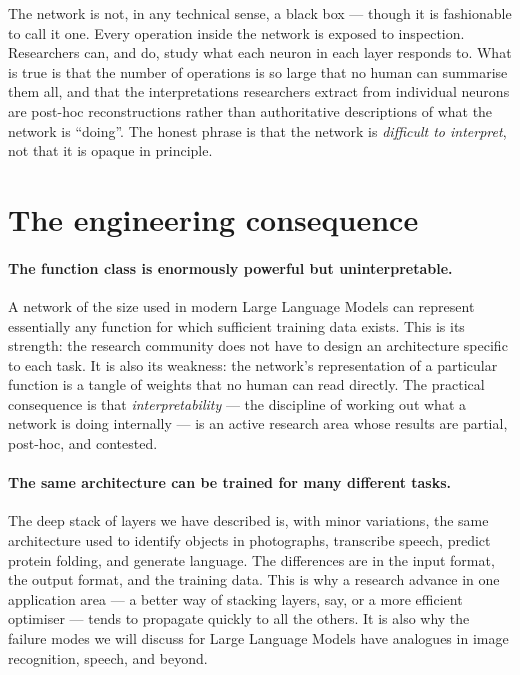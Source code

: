 The network is not, in any technical sense, a black box ---
though it is fashionable to call it one. Every operation
inside the network is exposed to inspection. Researchers can,
and do, study what each neuron in each layer responds to.
What is true is that the number of operations is so large
that no human can summarise them all, and that the
interpretations researchers extract from individual neurons
are post-hoc reconstructions rather than authoritative
descriptions of what the network is ``doing''. The honest
phrase is that the network is \emph{difficult to interpret},
not that it is opaque in principle.

\section{The engineering consequence}

\paragraph{The function class is enormously powerful but
uninterpretable.} A network of the size used in modern Large
Language Models can represent essentially any function for which
sufficient training data exists. This is its strength: the
research community does not have to design an architecture
specific to each task. It is also its weakness: the network's
representation of a particular function is a tangle of weights
that no human can read directly. The practical consequence is
that \emph{interpretability} --- the discipline of working out
what a network is doing internally --- is an active research
area whose results are partial, post-hoc, and contested.

\paragraph{The same architecture can be trained for many
different tasks.} The deep stack of layers we have described
is, with minor variations, the same architecture used to
identify objects in photographs, transcribe speech, predict
protein folding, and generate language. The differences are in
the input format, the output format, and the training data.
This is why a research advance in one application area --- a
better way of stacking layers, say, or a more efficient
optimiser --- tends to propagate quickly to all the others. It
is also why the failure modes we will discuss for Large
Language Models have analogues in image recognition, speech,
and beyond.

